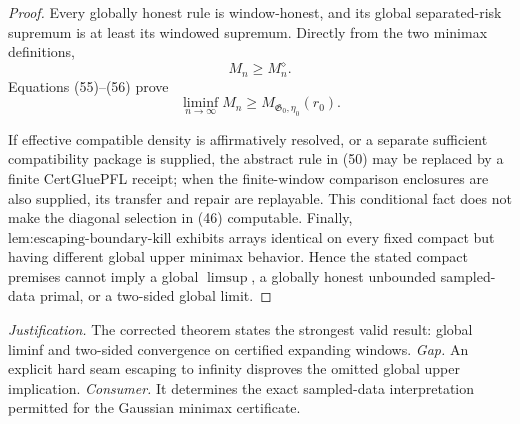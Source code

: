 \documentclass{article}
\begin{document}
\begin{proof}
Every globally honest rule is window-honest, and its global separated-risk supremum is at least its windowed supremum.  Directly from the two minimax definitions,
\[
 M_n\ge M_n^{\diamond}.
 \tag{56}
\]
Equations (55)--(56) prove
\[
 \liminf_{n\to\infty}M_n
 \ge M_{\mathfrak G_0,\eta_0}(r_0).
 \tag{57}
\]

If effective compatible density is affirmatively resolved, or a separate sufficient compatibility package is supplied, the abstract rule in (50) may be replaced by a finite CertGluePFL receipt; when the finite-window comparison enclosures are also supplied, its transfer and repair are replayable.  This conditional fact does not make the diagonal selection in (46) computable.  Finally, \(\text{lem:escaping-boundary-kill}\) exhibits arrays identical on every fixed compact but having different global upper minimax behavior.  Hence the stated compact premises cannot imply a global \(\limsup\), a globally honest unbounded sampled-data primal, or a two-sided global limit.
\end{proof}
\par\smallskip\noindent \textit{Justification.} The corrected theorem states the strongest valid result: global liminf and two-sided convergence on certified expanding windows. \textit{Gap.} An explicit hard seam escaping to infinity disproves the omitted global upper implication. \textit{Consumer.} It determines the exact sampled-data interpretation permitted for the Gaussian minimax certificate.
\end{document}
